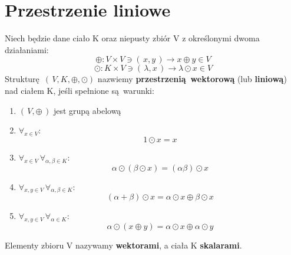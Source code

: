 \section{Przestrzenie liniowe}
\begin{definition}
    Niech będzie dane ciało K oraz niepusty zbiór V z określonymi dwoma działaniami:
    \begin{equation*}
        \tag{dodawanie}
        \oplus: V \times V \ni (\,x,y\,) \rightarrow x \oplus y \in V
    \end{equation*}
    \begin{equation*}
        \tag{mnożenie przez element ciała}
        \odot: K \times V \ni (\,\lambda,x\,) \rightarrow \lambda \odot x \in V
    \end{equation*}
    Strukturę $(\,V,K,\oplus,\odot)$ nazwiemy \textbf{przestrzenią wektorową} (lub \textbf{liniową}) nad ciałem K, jeśli spełnione są warunki:
    \begin{enumerate}
        \item $(\,V,\oplus\,)$ jest grupą abelową
        \item $\forall_{x \in V}$:
            \begin{equation*}
                1\odot x = x
            \end{equation*}
        \item $\forall_{x \in V}\,\forall_{\alpha,\beta \in K}$:
            \begin{equation*}
                \tag{prawo łączności}
                \alpha\odot(\beta\odot x) = (\alpha\beta)\odot x
            \end{equation*}
        \item $\forall_{x,y \in V}\, \forall_{\alpha,\beta \in K}$:
            \begin{equation*}
                \tag{rozdzielność dodawania względem mnożenia}
                (\alpha + \beta)\odot x = \alpha \odot x \oplus \beta \odot x
            \end{equation*}
        \item $\forall_{x,y \in V}\, \forall_{\alpha \in K}$:
            \begin{equation*}
                \tag{rozdzielność mnożenia względem dodawania}
                \alpha\odot(x \oplus y) = \alpha\odot x \oplus \alpha\odot y
            \end{equation*}
    \end{enumerate}
    Elementy zbioru V nazywamy \textbf{wektorami}, a ciała K \textbf{skalarami}.
\end{definition}
